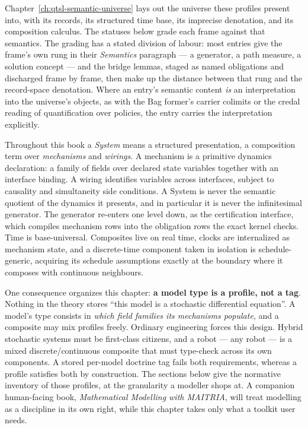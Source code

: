 Chapter~\ref{ch:qtsl-semantic-universe} lays out the universe these
profiles present into, with its records, its structured time base, its
imprecise denotation, and its composition calculus. The statuses below
grade each frame against that semantics. The grading has a stated
division of labour: most entries give the frame's own rung in their
\emph{Semantics} paragraph --- a generator, a path measure, a
solution concept --- and the bridge lemmas, staged as named obligations
and discharged frame by frame, then make up the distance between that
rung and the record-space denotation. Where an entry's semantic
content \emph{is} an interpretation into the universe's objects, as
with the Bag former's carrier colimits or the credal reading of
quantification over policies, the entry carries the interpretation
explicitly.\medskip

Throughout this book a \emph{System} means a structured presentation,
a composition term over \emph{mechanisms} and \emph{wirings}. A
mechanism is a primitive dynamics declaration: a family of fields
over declared state variables together with an interface binding. A
wiring identifies variables across interfaces, subject to causality
and simultaneity side conditions. A System is never the
semantic quotient of the dynamics it presents, and in particular it
is never the infinitesimal generator. The generator re-enters one level
down, as the certification interface, which compiles mechanism rows
into the obligation rows the exact kernel checks. Time is
base-universal. Composites live on real time, clocks are internalized
as mechanism state, and a discrete-time component taken in isolation
is schedule-generic, acquiring its schedule assumptions exactly
at the boundary where it composes with continuous neighbours.

One consequence organizes this chapter: \textbf{a model type is a
profile, not a tag}. Nothing in the theory stores ``this model is a
stochastic differential equation''. A model's type consists in
\emph{which field families its mechanisms populate}, and a composite
may mix profiles freely. Ordinary engineering forces this design.
Hybrid stochastic systems must be first-class citizens, and a robot
--- any robot --- is a mixed discrete/continuous composite that must
type-check across its own components. A stored per-model doctrine tag
fails both requirements, whereas a profile satisfies both by
construction. The sections below give the normative inventory of those
profiles, at the granularity a modeller shops at. A companion
human-facing book, \emph{Mathematical Modelling with MAITRIA}, will
treat modelling as a discipline in its own right, while this chapter
takes only what a toolkit user needs.


